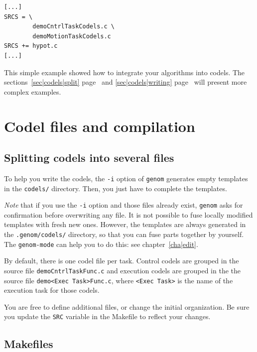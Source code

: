 \begin{center}\begin{cartouche}\small\begin{verbatim}
[...]
SRCS = \
        demoCntrlTaskCodels.c \
        demoMotionTaskCodels.c
SRCS += hypot.c
[...]
\end{verbatim}\end{cartouche}\end{center}

This simple example showed how to integrate  your algorithms into codels.
The sections~\ref{sec|codels|split} page~\pageref{sec|codels|split} and
\ref{sec|codels|writing} page~\pageref{sec|codels|writing} will present
more complex examples.


\section{Codel files and compilation}

\subsection{Splitting codels into several files}

To help you   write the  codels, the \texttt{-i}  option of  \texttt{genom}
generates empty templates in the \texttt{codels/} directory. Then, you just
have to complete the templates.

\emph{Note}  that if you use the  \texttt{-i} option  and those files already
exist, \texttt{genom} asks for confirmation before  overwriting any file. It
is not possible to  fuse locally modified  templates with fresh new ones.
However, the   templates are always generated  in  the  \texttt{.genom/codels/}
directory, so  that  you can fuse   parts together by  yourself. The 
\texttt{genom-mode} can help you to do this: see chapter~\ref{cha|edit}.

By default, there is one codel file per task.  Control codels are grouped
in the  source file  \texttt{demoCntrlTaskFunc.c}  and execution  codels are
grouped  in the the source  file \texttt{demo<Exec  Task>Func.c}, where 
\texttt{<Exec Task>} is the name of the execution task for those codels.

You are    free  to define   additional  files,  or  change  the  initial
organization.  Be sure you update the  \texttt{SRC} variable in the Makefile
to reflect your changes.


\subsection{Makefiles}

